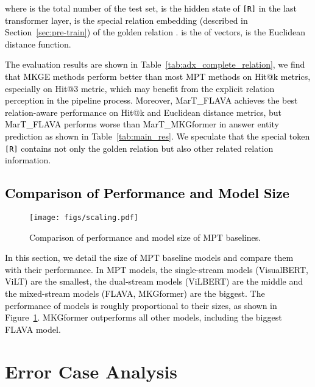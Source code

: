 \documentclass{article} \usepackage{iclr2023_conference,times}
\newcommand{\ours}{MarT}
\begin{document}
\textcolor{black}{
where  is the total number of the test set,  is the hidden state of \texttt{[R]} in the last transformer layer,  is the special relation embedding (described in Section~\ref{sec:pre-train}) of the golden relation .  is the  of vectors,  is the Euclidean distance function.}

\textcolor{black}{
The evaluation results are shown in Table~\ref{tab:adx_complete_relation}, we find that MKGE methods perform better than most MPT methods on Hit@k metrics, especially on Hit@3 metric, which may benefit from the explicit relation perception in the pipeline process. Moreover, {\ours}\_FLAVA achieves the best relation-aware performance on Hit@k and Euclidean distance metrics, but {\ours}\_FLAVA performs worse than {\ours}\_MKGformer in answer entity prediction as shown in Table~\ref{tab:main_res}. We speculate that the special token \texttt{[R]} contains not only the golden relation but also other related relation information.
}














\subsection{\textcolor{black}{Comparison of Performance and Model Size}}

\begin{figure}[!htp]
\centering
\texttt{[image: figs/scaling.pdf]}
\caption{\textcolor{black}{Comparison of performance and model size of MPT baselines.}}
\label{fig:adx_sclaing}
\end{figure}

\textcolor{black}{In this section, we detail the size of MPT baseline models and compare them with their performance. In MPT models, the single-stream models (VisualBERT, ViLT) are the smallest, the dual-stream models (ViLBERT) are the middle and the mixed-stream models (FLAVA, MKGformer) are the biggest. The performance of models is roughly proportional to their sizes, as shown in Figure~\ref{fig:adx_sclaing}. MKGformer outperforms all other models, including the biggest FLAVA model.}


\section{Error Case Analysis}
\label{adx:error_case}
\end{document}

